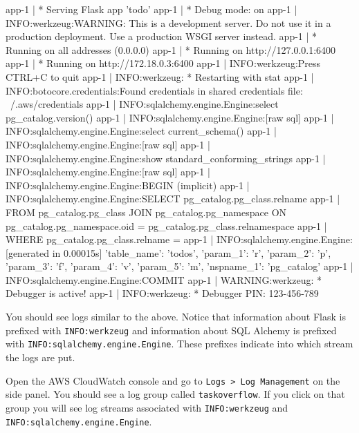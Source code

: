 \documentclass{csse4400}
\begin{document}
\begin{code}[numbers=none]{}
app-1       |  * Serving Flask app 'todo'
app-1       |  * Debug mode: on
app-1       | INFO:werkzeug:WARNING: This is a development server. Do not use it in a production deployment. Use a production WSGI server instead.
app-1       |  * Running on all addresses (0.0.0.0)
app-1       |  * Running on http://127.0.0.1:6400
app-1       |  * Running on http://172.18.0.3:6400
app-1       | INFO:werkzeug:Press CTRL+C to quit
app-1       | INFO:werkzeug: * Restarting with stat
app-1       | INFO:botocore.credentials:Found credentials in shared credentials file: ~/.aws/credentials
app-1       | INFO:sqlalchemy.engine.Engine:select pg_catalog.version()
app-1       | INFO:sqlalchemy.engine.Engine:[raw sql] {}
app-1       | INFO:sqlalchemy.engine.Engine:select current_schema()
app-1       | INFO:sqlalchemy.engine.Engine:[raw sql] {}
app-1       | INFO:sqlalchemy.engine.Engine:show standard_conforming_strings
app-1       | INFO:sqlalchemy.engine.Engine:[raw sql] {}
app-1       | INFO:sqlalchemy.engine.Engine:BEGIN (implicit)
app-1       | INFO:sqlalchemy.engine.Engine:SELECT pg_catalog.pg_class.relname
app-1       | FROM pg_catalog.pg_class JOIN pg_catalog.pg_namespace ON pg_catalog.pg_namespace.oid = pg_catalog.pg_class.relnamespace
app-1       | WHERE pg_catalog.pg_class.relname = %
app-1       | INFO:sqlalchemy.engine.Engine:[generated in 0.00015s] {'table_name': 'todos', 'param_1': 'r', 'param_2': 'p', 'param_3': 'f', 'param_4': 'v', 'param_5': 'm', 'nspname_1': 'pg_catalog'}
app-1       | INFO:sqlalchemy.engine.Engine:COMMIT
app-1       | WARNING:werkzeug: * Debugger is active!
app-1       | INFO:werkzeug: * Debugger PIN: 123-456-789
\end{code}

You should see logs similar to the above.
Notice that information about Flask is prefixed with \texttt{INFO:werkzeug} and information about SQL Alchemy is prefixed with \texttt{INFO:sqlalchemy.engine.Engine}.
These prefixes indicate into which stream the logs are put.

Open the AWS CloudWatch console and go to \texttt{Logs > Log Management} on the side panel.
You should see a log group called \texttt{taskoverflow}.
If you click on that group you will see log streams associated with \texttt{INFO:werkzeug}
and \texttt{INFO:sqlalchemy.engine.Engine}.
\end{document}
